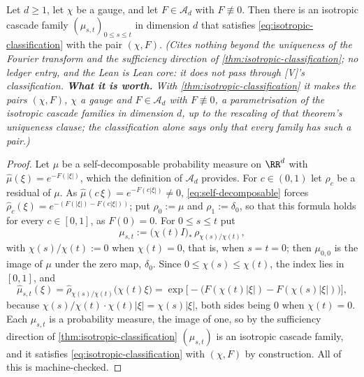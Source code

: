 \begin{lemma}
\label{lem:isotropic-realisation}
\leanok
Let $d \ge 1$, let $\chi$ be a gauge, and let $F \in \mathcal{A}_d$ with $F \not\equiv 0$. Then
there is an isotropic cascade family $(\mu_{s,t})_{0 \le s \le t}$ in dimension $d$ that satisfies
\ref{eq:isotropic-classification} with the pair $(\chi, F)$.
\statusT\quad\emph{(Cites nothing beyond the uniqueness of the Fourier transform and the
sufficiency direction of \ref{thm:isotropic-classification}; no ledger entry, and the Lean is Lean
core: it does not pass through [V]'s classification. \textbf{What it is worth.} With
\ref{thm:isotropic-classification} it makes the pairs $(\chi, F)$, $\chi$ a gauge and
$F \in \mathcal{A}_d$ with $F \not\equiv 0$, a parametrisation of the isotropic cascade families in
dimension $d$, up to the rescaling of that theorem's uniqueness clause; the classification alone
says only that every family has such a pair.)}
\end{lemma}

\begin{proof}
\leanok
Let $\mu$ be a self-decomposable probability measure on $\RR^d$ with
$\widehat\mu(\xi) = e^{-F(|\xi|)}$, which the definition of $\mathcal{A}_d$ provides. For
$c \in (0,1)$ let $\rho_c$ be a residual of $\mu$. As $\widehat\mu(c\,\xi) = e^{-F(c|\xi|)} \ne 0$,
\ref{eq:self-decomposable} forces $\widehat\rho_c(\xi) = e^{-(F(|\xi|) - F(c|\xi|))}$; put
$\rho_0 := \mu$ and $\rho_1 := \delta_0$, so that this formula holds for every $c \in [0,1]$, as
$F(0) = 0$. For $0 \le s \le t$ put
\[
  \mu_{s,t} := \bigl(\chi(t)I\bigr)_*\,\rho_{\chi(s)/\chi(t)} ,
\]
with $\chi(s)/\chi(t) := 0$ when $\chi(t) = 0$, that is, when $s = t = 0$; then $\mu_{0,0}$ is
the image of $\mu$ under the zero map, $\delta_0$. Since
$0 \le \chi(s) \le \chi(t)$, the index lies in $[0,1]$, and
\[
  \widehat\mu_{s,t}(\xi) = \widehat\rho_{\chi(s)/\chi(t)}\bigl(\chi(t)\xi\bigr)
  = \exp\bigl[-\bigl(F(\chi(t)|\xi|) - F(\chi(s)|\xi|)\bigr)\bigr] ,
\]
because $\chi(s)/\chi(t)\cdot\chi(t)|\xi| = \chi(s)|\xi|$, both sides being $0$ when
$\chi(t) = 0$. Each $\mu_{s,t}$ is a probability measure, the image of one, so by the sufficiency
direction of \ref{thm:isotropic-classification} $(\mu_{s,t})$ is an isotropic cascade family, and
it satisfies \ref{eq:isotropic-classification} with $(\chi, F)$ by construction. All of this is
machine-checked.
\end{proof}

